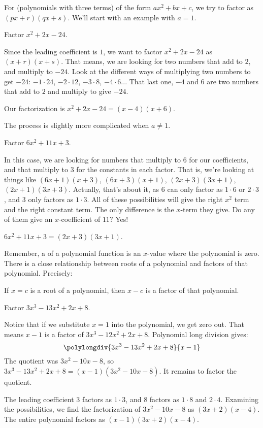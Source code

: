 \documentclass{ximera}
\begin{document}
For  (polynomials with three terms) of the form $ax^2 + bx + c$, we try to factor as $(px+r)(qx+s)$.  We'll start with an example with $a=1$.
\begin{example}
	Factor $x^2+2x-24$.
	\begin{explanation}
		Since the leading coefficient is $1$, we want to factor $x^2+2x-24$ as $(x+r)(x+s)$.  That means, we are looking for two numbers that add to $2$,
		and multiply to $-24$.  Look at the different ways of multiplying two numbers to get $-24$:  $-1 \cdot 24$, $-2 \cdot 12$, $-3 \cdot 8$, $-4 \cdot 6$...
		That last one, $-4$ and $6$ are two numbers that add to $2$ and multiply to give $-24$.
		
		Our factorization is $x^2+2x-24 = (x-4)(x+6)$.
	\end{explanation}
\end{example}

The process is slightly more complicated when $a \neq 1$.
\begin{example}
	Factor $6x^2 + 11 x + 3$.
	\begin{explanation}
		In this case, we are looking for numbers that multiply to $6$ for our coefficients, and that multiply to $3$ for the constants in each
		factor.
		That is, we're looking at things like $(6x+1)(x+3)$, $(6x+3)(x+1)$, $(2x+3)(3x+1)$, $(2x+1)(3x+3)$.   Actually, that's about it, as $6$ can only
		factor as $1 \cdot 6$ or $2 \cdot 3$, and $3$ only factors as $1 \cdot 3$.
		All of these possibilities will give the right $x^2$ term and the right constant term.  The only difference is the $x$-term they give.  Do any of them
		give an $x$-coefficient of $11$?  Yes!
		
		$6x^2+11x+3 = (2x+3)(3x+1)$.
	\end{explanation}
\end{example}

Remember, a  of a polynomial function is an $x$-value where the polynomial is zero. 
There is a close relationship between roots of a polynomial and factors of that polynomial.  Precisely:
\begin{theorem}
If $x=c$ is a root of a polynomial, then $x-c$ is a factor of that polynomial.
\end{theorem}

\begin{example}
	Factor $3x^3-13x^2+2x+8$.
	\begin{explanation}
		Notice that if we substitute $x=1$ into the polynomial, we get zero out.  That means $x-1$ is a factor of $3x^3-12x^2+2x+8$.
		Polynomial long division gives:
		\[\polylongdiv{3x^3-13x^2+2x+8}{x-1}\]
		The quotient was $3x^2-10x-8$, so $3x^3-13x^2+2x+8 = (x-1)(3x^2-10x-8)$.  It remains to factor the quotient.
		
		The leading coefficient $3$ factors as $1 \cdot 3$, and $8$ factors as $1 \cdot 8$ and $2 \cdot 4$.  Examining the possibilities, we find the factorization
		of $3x^2-10x-8$ as $(3x+2)(x-4)$.  The entire polynomial factors as $(x-1)(3x+2)(x-4)$.
	\end{explanation}
\end{example}
\end{document}
